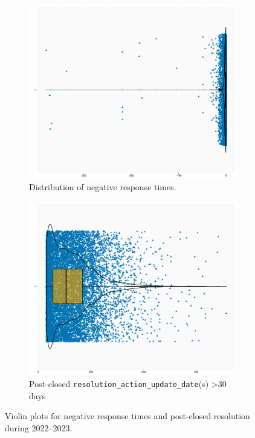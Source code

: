 \documentclass[linenumber]{jdsart}
\begin{document}
\begin{figure}[tbp]
  \centering
  \begin{subfigure}[t]{0.495\textwidth} %
    \centering
    \includegraphics[width=\textwidth]{negative_duration_SR_violin.pdf}
    \caption{Distribution of negative response times.}
    \label{fig:negative-duration-violin}
  \end{subfigure}
  \hfill %
  \begin{subfigure}[t]{0.495\textwidth} %
    \centering
    \includegraphics[width=\textwidth]{post_closed_violin_chart.pdf}
    \caption{Post-closed \texttt{resolution\_action\_update\_date}(s) >30 days}
    \label{fig:resolution-violin}
  \end{subfigure}
  \caption{Violin plots for negative response times and post-closed
    resolution during 2022--2023.}
  \label{fig:violin-plots}
\end{figure}
\end{document}

